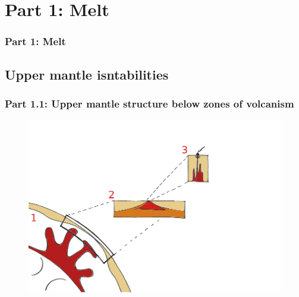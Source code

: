\documentclass[aspectratio=169]{beamer}
\begin{document}
\section{Part 1: Melt}

{
\begin{frame}
    \frametitle{Part 1: Melt}
\end{frame}
}

\subsection{Upper mantle isntabilities}

\begin{frame}
    \frametitle{Part 1.1: Upper mantle structure below zones of volcanism}
    \begin{figure}
        \includegraphics[height=0.9\paperheight]{./pictures/drawing.png}
    \end{figure}
\end{frame}
\end{document}
